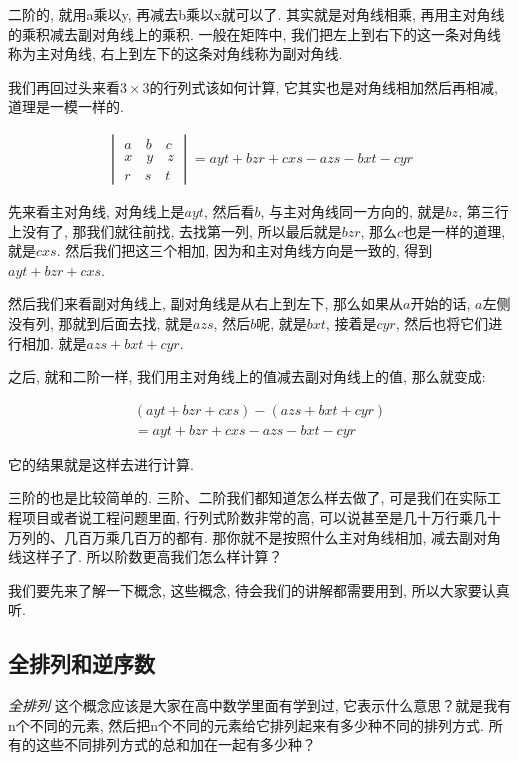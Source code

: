 二阶的, 就用a乘以y, 再减去b乘以x就可以了. 其实就是对角线相乘, 再用主对角线的乘积减去副对角线上的乘积. 一般在矩阵中, 我们把左上到右下的这一条对角线称为主对角线, 右上到左下的这条对角线称为副对角线. 

我们再回过头来看$3 \times 3$的行列式该如何计算, 它其实也是对角线相加然后再相减, 道理是一模一样的. 

\begin{align*}
  \begin{vmatrix}
  a \quad b \quad c \\
  x \quad y \quad z \\
  r \quad s \quad t
  \end{vmatrix}
  =
  ayt + bzr + cxs - azs - bxt -cyr
\end{align*}

先来看主对角线, 对角线上是$ayt$, 然后看$b$,  与主对角线同一方向的, 就是$bz$, 第三行上没有了, 那我们就往前找, 去找第一列, 所以最后就是$bzr$, 那么$c$也是一样的道理, 就是$cxs$. 然后我们把这三个相加, 因为和主对角线方向是一致的, 得到$ayt + bzr + cxs$. 

然后我们来看副对角线上, 副对角线是从右上到左下, 那么如果从$a$开始的话, $a$左侧没有列, 那就到后面去找, 就是$azs$, 然后$b$呢, 就是$bxt$, 接着是$cyr$, 然后也将它们进行相加. 就是$azs+bxt+cyr$. 

之后, 就和二阶一样, 我们用主对角线上的值减去副对角线上的值, 那么就变成: 

\begin{align*}
  (ayt + bzr + cxs) - (azs+bxt+cyr) \\
  = ayt + bzr + cxs - azs - bxt -cyr
\end{align*}

它的结果就是这样去进行计算. 

三阶的也是比较简单的. 三阶、二阶我们都知道怎么样去做了, 可是我们在实际工程项目或者说工程问题里面, 行列式阶数非常的高, 可以说甚至是几十万行乘几十万列的、几百万乘几百万的都有. 那你就不是按照什么主对角线相加, 减去副对角线这样子了. 所以阶数更高我们怎么样计算？

我们要先来了解一下概念, 这些概念, 待会我们的讲解都需要用到, 所以大家要认真听. 

\subsection{全排列和逆序数}

\textit{全排列} 这个概念应该是大家在高中数学里面有学到过, 它表示什么意思？就是我有n个不同的元素, 然后把n个不同的元素给它排列起来有多少种不同的排列方式. 所有的这些不同排列方式的总和加在一起有多少种？


